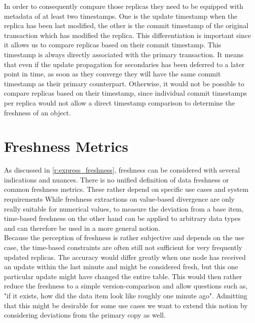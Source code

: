 In order to consequently compare those replicas they need to be equipped with metadata of at least two timestamps. 
One is the update timestamp when the replica has been last modified,
the other is the commit timestamp of the original transaction which has modified the replica.
This differentiation is important since it allows us to compare replicas based on their commit timestamp. This timestamp is always directly associated with the primary transaction.
It means that even if the update propagation for secondaries has been deferred to a later point in time, as soon as they converge they will have the same commit timestamp 
as their primary counterpart.
Otherwise, it would not be possible to compare replicas based on their timestamp, since individual commit timestamps per replica would not allow a direct timestamp comparison 
to determine the freshness of an object.



\section{Freshness Metrics}
\label{sec:freshne_metrics}

As discussed in \ref{r:express_freshness}, freshness can be considered with several indications and nuances.
There is no unified definition of data freshness or common freshness metrics.
These rather depend on specific use cases and system requirements
While freshness extractions on value-based divergence are only really suitable for numerical values,
to measure the deviation from a base item, time-based freshness on the other hand can be applied to arbitrary data types and can therefore be used 
in a more general notion.\\
Because the perception of freshness is rather subjective and depends on the use case, the time-based constraints are often still not sufficient for very frequently
updated replicas.
The accuracy would differ greatly when one node has received an update within the last minute and might be considered fresh, but this one particular 
update might have changed the entire table. 
This would then rather reduce the freshness to a simple version-comparison and allow questions such as, "if it exists, how did the data item look like roughly one minute ago".
Admitting that this might be desirable for some use cases we want to extend this notion by considering deviations from the primary copy as well.\\

